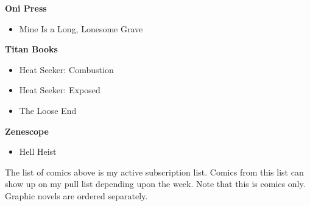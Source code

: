 \documentclass{article}
\begin{document}
\begin{multicols}{2}
{  \textbf{Oni Press}
  \begin{itemize}
    \item Mine Is a Long, Lonesome Grave
  \end{itemize}

  \textbf{Titan Books}
  \begin{itemize}
    \item Heat Seeker: Combustion
    \item Heat Seeker: Exposed
    \item The Loose End
  \end{itemize}

  \textbf{Zenescope}
  \begin{itemize}
    \item Hell Heist
  \end{itemize}

}

\end{multicols}

\begin{tcolorbox}[title=Subscription List Key]
    The list of comics above is my active subscription list. Comics from this list can show up on my pull list depending upon the week. Note that this is comics only. Graphic novels are ordered separately. 
\end{tcolorbox}
\end{document}
